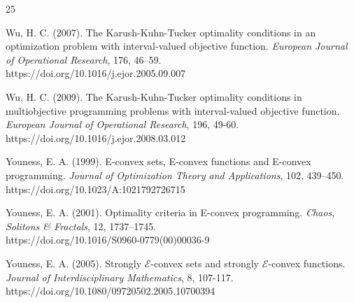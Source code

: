 \documentclass[12pt, reqno]{amsart}
\theoremstyle{definition}
\theoremstyle{remark}
\numberwithin{equation}{section}
\begin{document}
\begin{thebibliography}{25}

  Wu, H. C. (2007). The Karush-Kuhn-Tucker optimality conditions in an optimization problem with interval-valued objective function. \textit{European Journal of Operational Research}, 176, 46–59.\\
https://doi.org/10.1016/j.ejor.2005.09.007


 Wu, H. C. (2009). The Karush-Kuhn-Tucker optimality conditions in multiobjective programming problems with interval-valued objective function. \textit{European Journal of Operational Research}, 196, 49-60. \\
https://doi.org/10.1016/j.ejor.2008.03.012


        
 Youness, E. A. (1999). E-convex sets, E-convex functions and E-convex programming. \textit{Journal of Optimization Theory and Applications}, 102, 439–450.\\
https://doi.org/10.1023/A:1021792726715
        
  Youness, E. A. (2001). Optimality criteria in E-convex programming. \textit{Chaos, Solitons \& Fractals}, 12, 1737–1745.\\
 https://doi.org/10.1016/S0960-0779(00)00036-9 
        
  Youness, E. A. (2005). Strongly $\mathcal{E}$-convex sets and strongly $\mathcal{E}$-convex functions. \textit{Journal of Interdisciplinary Mathematics},  8, 107-117. \\
 https://doi.org/10.1080/09720502.2005.10700394    
    
       \end{thebibliography}
      
\end{document}
